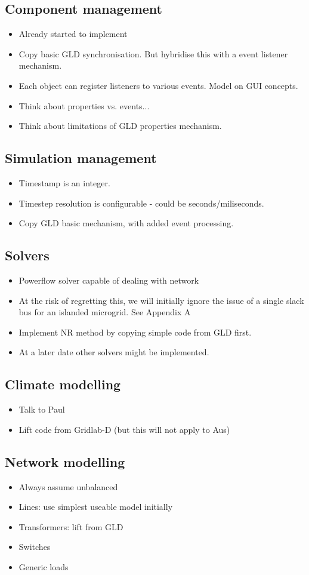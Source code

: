 \documentclass[12pt]{article}
\newcommand{\itm}[1]{\begin{itemize}#1\end{itemize}}
\begin{document}
\subsection{Component management}
\itm{
	\item Already started to implement
	\item Copy basic GLD synchronisation. But hybridise this with a event listener mechanism.
	\item Each object can register listeners to various events. Model on GUI concepts.
	\item Think about properties vs. events...
	\item Think about limitations of GLD properties mechanism.
}

\subsection{Simulation management}
\itm{
	\item Timestamp is an integer.
	\item Timestep resolution is configurable - could be seconds/miliseconds.
	\item Copy GLD basic mechanism, with added event processing.
}

\subsection{Solvers}
\itm{
	\item Powerflow solver capable of dealing with network
	\item At the risk of regretting this, we will initially ignore the issue of a single slack bus for an islanded microgrid. See Appendix A
	\item Implement NR method by copying simple code from GLD first.
	\item At a later date other solvers might be implemented.
}

\subsection{Climate modelling}
\itm{
	\item Talk to Paul
	\item Lift code from Gridlab-D (but this will not apply to Aus)
}

\subsection{Network modelling}
\itm{
	\item Always assume unbalanced
	\item Lines: use simplest useable model initially
	\item Transformers: lift from GLD
	\item Switches
	\item Generic loads
}
\end{document}
